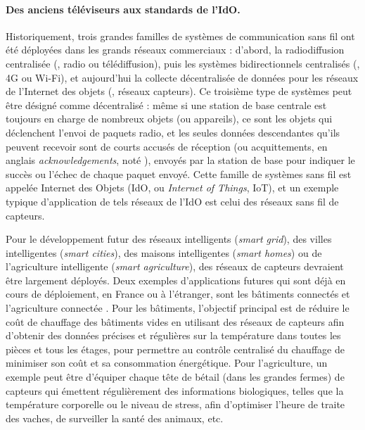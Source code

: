 \begin{resume_fr}
\paragraph{Des anciens téléviseurs aux standards de l'IdO.}
%
Historiquement, trois grandes familles de systèmes de communication sans fil ont été déployées dans les grands réseaux commerciaux : d'abord, la radiodiffusion centralisée (\eg, radio ou télédiffusion), puis les systèmes bidirectionnels centralisés (\eg, 4G ou Wi-Fi), et aujourd'hui la collecte décentralisée de données pour les réseaux de l'Internet des objets (\eg, réseaux capteurs).
%
Ce troisième type de systèmes peut être désigné comme décentralisé :
même si une station de base centrale est toujours en charge de nombreux objets (ou appareils),
ce sont les objets qui déclenchent l'envoi de paquets radio, et les seules données descendantes qu'ils peuvent recevoir sont de courts accusés de réception (ou acquittements, en anglais \emph{acknowledgements}, noté \Ack), envoyés par la station de base pour indiquer le succès ou l'échec de chaque paquet envoyé.
Cette famille de systèmes sans fil est appelée Internet des Objets (IdO, ou \emph{Internet of Things}, IoT),
et un exemple typique d'application de tels réseaux de l'IdO est celui des réseaux sans fil de capteurs.

Pour le développement futur des \guillemotleft{} réseaux intelligents \guillemotright{} (\emph{smart grid}), des \guillemotleft{} villes intelligentes \guillemotright{} (\emph{smart cities}), des \guillemotleft{} maisons intelligentes \guillemotright{} (\emph{smart homes}) ou de \guillemotleft{} l'agriculture intelligente \guillemotright{} (\emph{smart agriculture}), des réseaux de capteurs devraient être largement déployés.
Deux exemples d'applications futures qui sont déjà en cours de déploiement, en France ou à l'étranger, sont les \guillemotleft{} bâtiments connectés \guillemotright{} et \guillemotleft{} l'agriculture connectée \guillemotright{}.
Pour les bâtiments, l'objectif principal est de réduire le coût de chauffage des bâtiments vides en utilisant des réseaux de capteurs afin d'obtenir des données précises et régulières sur la température dans toutes les pièces et tous les étages, pour permettre au contrôle centralisé du chauffage de minimiser son coût et sa consommation énergétique.
Pour l'agriculture, un exemple peut être d'équiper chaque tête de bétail (dans les grandes fermes) de capteurs qui émettent régulièrement des informations biologiques, telles que la température corporelle ou le niveau de stress, afin d'optimiser l'heure de traite des vaches, de surveiller la santé des animaux, etc.



\end{resume_fr}

